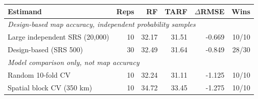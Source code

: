 \begin{tabular}{lrrrrr}
\toprule
Estimand & Reps & RF & TARF & $\Delta$RMSE & Wins \\
\midrule
\multicolumn{6}{l}{\emph{Design-based map accuracy, independent probability samples}} \\
Large independent SRS (20{,}000) & 10 & 32.17 & 31.51 & -0.669 & 10/10 \\
Design-based (SRS 500) & 30 & 32.49 & 31.64 & -0.849 & 28/30 \\
\midrule
\multicolumn{6}{l}{\emph{Model comparison only, not map accuracy}} \\
Random 10-fold CV & 10 & 32.24 & 31.11 & -1.125 & 10/10 \\
Spatial block CV (350 km) & 10 & 34.72 & 33.45 & -1.275 & 10/10 \\
\bottomrule
\end{tabular}
